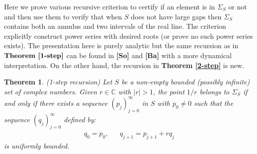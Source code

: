 \documentclass[11pt]{amsart}
\newtheorem{theorem}{Theorem}
\numberwithin{theorem}{section} %
\numberwithin{corollary}{section}
\numberwithin{lemma}{section}
\numberwithin{proposition}{section}
\numberwithin{definition}{section}
\begin{document}
Here we prove various recursive criterion to certify if an element is in $\Sigma_S$ or not and then use them to verify that when $S$ does not have large gaps then $\Sigma_S$ contains both an annulus and two intervals of the real line. The criterion explicitly construct power series with desired roots (or prove no such power series exists). The presentation here is purely analytic but the same recursion as in $\textbf{Theorem \ref{1-step}}$ can be found in \textbf{[So]} and \textbf{[Ba]} with a more dynamical interpretation. On the other hand, the recursion in \textbf{Theorem \ref{2-step}} is new.

\begin{theorem}(1-step recursion)
\label{1-step}
Let $S$ be a non-empty bounded (possibly infinite) set of complex numbers. Given $r \in \mathbb{C}$ with $|r| > 1$, the point $1/r$ belongs to $\Sigma_S$ if and only if there exists a sequence $(p_j)_{j=0}^\infty$ in $S$ with $p_0 \neq 0$ such that the sequence $(q_j)_{j=0}^\infty$ defined by:
\begin{align*}
q_0 = p_0, & & q_{j+1} = p_{j+1} + rq_j
 \end{align*}
 is uniformly bounded.
\end{theorem}
\end{document}
